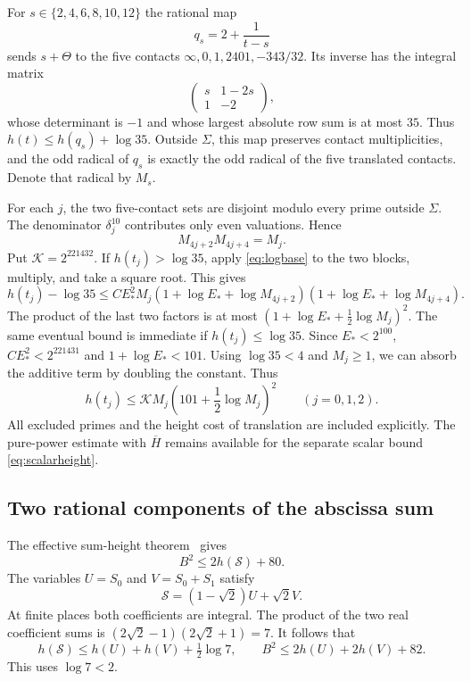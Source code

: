 \documentclass[11pt,a4paper]{article}
\begin{document}
For $s\in\{2,4,6,8,10,12\}$ the rational map
\[
                         q_s=2+\frac1{t-s}
\]
sends $s+\Theta$ to the five contacts
$\infty,0,1,2401,-343/32$. Its inverse has the integral matrix
\[
                         \begin{pmatrix}s&1-2s\\1&-2\end{pmatrix},
\]
whose determinant is $-1$ and whose largest absolute row sum is
at most $35$. Thus $h(t)\le h(q_s)+\log35$.
Outside $\Sigma$, this map preserves contact multiplicities, and
the odd radical of $q_s$ is exactly the odd radical of the five
translated contacts. Denote that radical by $M_s$.

For each $j$, the two five-contact sets are disjoint modulo every
prime outside $\Sigma$. The denominator $\delta_j^{10}$ contributes
only even valuations. Hence
\[
                         M_{4j+2}M_{4j+4}=M_j.
\]
Put $\mathcal K=2^{221432}$. If $h(t_j)>\log35$, apply
\eqref{eq:logbase} to the two blocks, multiply, and take a square
root. This gives
\[
 h(t_j)-\log35\le CE_*^2M_j
 (1+\log E_*+\log M_{4j+2})
 (1+\log E_*+\log M_{4j+4}).
\]
The product of the last two factors is at most
$(1+\log E_*+\tfrac12\log M_j)^2$. The same eventual bound
is immediate if $h(t_j)\le\log35$. Since $E_*<2^{100}$,
$CE_*^2<2^{221431}$ and $1+\log E_*<101$.
Using $\log35<4$ and $M_j\ge1$, we can absorb the additive
term by doubling the constant. Thus
\begin{equation}\label{eq:tenheight}
 h(t_j)\le \mathcal KM_j\left(101+\frac12\log M_j\right)^2
                              \qquad(j=0,1,2).
\end{equation}
All excluded primes and the height cost of translation are included
explicitly. The pure-power estimate with $\overline H$ remains
available for the separate scalar bound \eqref{eq:scalarheight}.

\subsection{Two rational components of the abscissa sum}

The effective sum-height theorem~\cite{Sums} gives
\[
                         B^2\le2h(\mathcal S)+80.
\]
The variables $U=S_0$ and $V=S_0+S_1$ satisfy
\[
                         \mathcal S=(1-\sqrt2)U+\sqrt2 V.
\]
At finite places both coefficients are integral. The product of
the two real coefficient sums is
$(2\sqrt2-1)(2\sqrt2+1)=7$. It follows that
\[
 h(\mathcal S)\le h(U)+h(V)+\tfrac12\log7,
 \qquad B^2\le2h(U)+2h(V)+82.
\]
This uses $\log7<2$.
\end{document}

